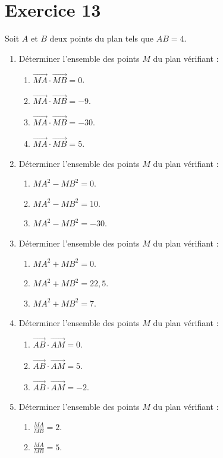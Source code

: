 \documentclass[12pt]{article}
\begin{document}
\section*{Exercice 13}

Soit $A$ et $B$ deux points du plan tels que $AB = 4$.

\begin{enumerate}
    \item Déterminer l’ensemble des points $M$ du plan vérifiant :
    \begin{enumerate}
        \item $\overrightarrow{MA} \cdot \overrightarrow{MB} = 0$.
        \item $\overrightarrow{MA} \cdot \overrightarrow{MB} = -9$.
        \item $\overrightarrow{MA} \cdot \overrightarrow{MB} = -30$.
        \item $\overrightarrow{MA} \cdot \overrightarrow{MB} = 5$.
    \end{enumerate}

    \item Déterminer l’ensemble des points $M$ du plan vérifiant :
    \begin{enumerate}
        \item $MA^2 - MB^2 = 0$.
        \item $MA^2 - MB^2 = 10$.
        \item $MA^2 - MB^2 = -30$.
    \end{enumerate}

    \item Déterminer l’ensemble des points $M$ du plan vérifiant :
    \begin{enumerate}
        \item $MA^2 + MB^2 = 0$.
        \item $MA^2 + MB^2 = 22,5$.
        \item $MA^2 + MB^2 = 7$.
    \end{enumerate}
\end{enumerate}
\begin{enumerate}
    \setcounter{enumi}{3}
    \item Déterminer l’ensemble des points $M$ du plan vérifiant :
    \begin{enumerate}
        \item $\overrightarrow{AB} \cdot \overrightarrow{AM} = 0$.
        \item $\overrightarrow{AB} \cdot \overrightarrow{AM} = 5$.
        \item $\overrightarrow{AB} \cdot \overrightarrow{AM} = -2$.
    \end{enumerate}

    \item Déterminer l’ensemble des points $M$ du plan vérifiant :
    \begin{enumerate}
        \item $\frac{MA}{MB} = 2$.
        \item $\frac{MA}{MB} = 5$.
    \end{enumerate}
\end{enumerate}
\end{document}
